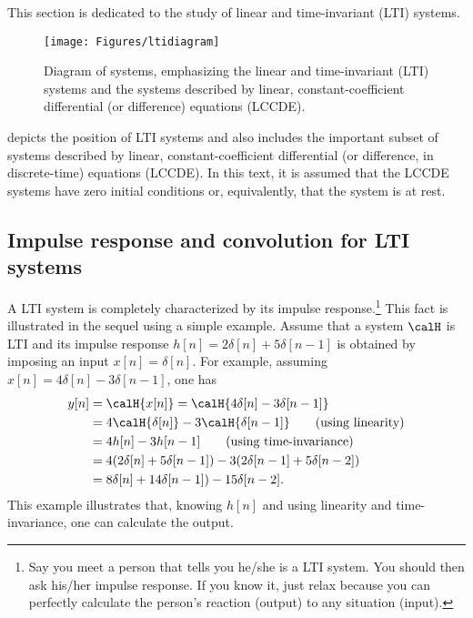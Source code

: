 This section is dedicated to the study of linear and time-invariant (LTI) systems. 

\begin{figure}
\centering
\texttt{[image: Figures/ltidiagram]}
\caption{Diagram of systems, emphasizing the linear and time-invariant (LTI) systems and the systems described by linear, constant-coefficient differential (or difference) equations (LCCDE).\label{fig:ltidiagram}}
\end{figure}

 depicts the position of LTI systems and also includes the important subset of systems described by linear, constant-coefficient differential (or difference, in discrete-time) equations (LCCDE). In this text, it is assumed that the LCCDE systems have zero initial conditions or, equivalently, that the system is at rest.


\subsection{Impulse response and convolution for LTI systems}
\label{sec:impresponse_convolution}

A LTI system is completely characterized by its impulse response.\footnote{Say you meet a person that tells you he/she is a LTI system. You should then ask his/her impulse response. If you know it, just relax because you can perfectly calculate the person's reaction (output) to any situation (input).} This fact is illustrated in the sequel using a simple example. Assume that a system $\calH$ is LTI and its impulse response $h[n]=2\delta[n] + 5\delta[n-1]$ is obtained by imposing an input $x[n]=\delta[n]$. For example, assuming $x[n]=4\delta[n]-3\delta[n-1]$, one has
\begin{align*}
y[n] & = \calH\{x[n]\} = \calH\{4\delta[n]-3\delta[n-1]\}\\
& = 4\calH\{\delta[n]\}-3 \calH\{\delta[n-1]\}\tag*{\text{(using linearity)}}\\
& = 4 h[n] - 3 h[n-1]\tag*{\text{(using time-invariance)}}\\
& = 4 (2\delta[n] + 5\delta[n-1]) - 3 (2\delta[n-1] + 5\delta[n-2])\\
& = 8\delta[n] + 14\delta[n-1]) - 15\delta[n-2].
\label{eq:example_lit}
\end{align*}
This example illustrates that, knowing $h[n]$ and using linearity and time-invariance, one can calculate the output.

